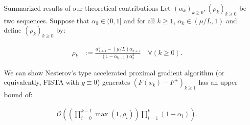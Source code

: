 \documentclass[11pt]{beamer}
\theoremstyle{definition}
\begin{document}
        \begin{frame}{Summarized results of our theoretical contributions}
            Let $(\alpha_k)_{k \ge0}, (\rho_k)_{k \ge 0}$ be two sequences. 
            Suppose that $\alpha_0 \in (0, 1]$ and for all $k \ge 1$, $\alpha_k \in (\mu/L, 1)$ and define $(\rho_k)_{k\ge0 }$ by: 
            \begin{tcolorbox}\noindent\vspace{-1em}
                \begin{align*}
                    \rho_k &:= \frac{\alpha_{k + 1}^2 - (\mu/L)\alpha_{k + 1}}{(1 - \alpha_{k + 1})\alpha_k^2} \quad \forall (k \ge 0).
                \end{align*}
            \end{tcolorbox}
            We can show Nesterov's type accelerated proximal gradient algorithm (or equivalently, FISTA with $g \equiv 0$) generates $(F(x_k) - F^+)_{k\ge 1}$ has an upper bound of: 
            \begin{tcolorbox}\noindent\vspace{-1em} 
                \begin{align*}
                    \mathcal O\left(
                        \left(
                            \prod_{i = 0}^{k - 1} \max(1, \rho_{i})
                        \right)
                        \prod_{i = 1}^{k} \left(1  - \alpha_i\right)
                    \right).
                \end{align*}
            \end{tcolorbox}
        \end{frame}
\end{document}
